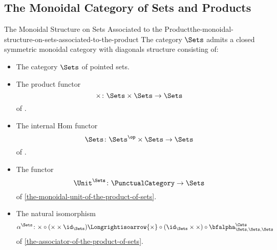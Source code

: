 \subsection{The Monoidal Category of Sets and Products}\label{subsection-the-monoidal-category-of-sets-and-products}
\begin{proposition}{The Monoidal Structure on Sets Associated to the Product}{the-monoidal-structure-on-sets-associated-to-the-product}%
    The category $\Sets$ admits a closed symmetric monoidal category with diagonals structure consisting of:%
    \begin{itemize}
        \item{}The category $\Sets$ of pointed sets.
        \item{}The product functor
            \[
                \times%
                \colon%
                \Sets\times\Sets%
                \to%
                \Sets
            \]%
            of .
        \item{}The internal Hom functor
            \[
                \Sets%
                \colon%
                \Sets^{\op}\times\Sets%
                \to%
                \Sets%
            \]%
            of .
        \item{}The functor
            \[
                \Unit^{\Sets}
                \colon
                \PunctualCategory
                \to
                \Sets
            \]%
            of \cref{the-monoidal-unit-of-the-product-of-sets}.
        \item{}The natural isomorphism
            \[
                \alpha^{\Sets}
                \colon
                {\times}\circ{({\times}\times\id_{\Sets})}
                \Longrightisoarrow
                {\times}\circ{(\id_{\Sets}\times{\times})}\circ{\bfalpha^{\Cats}_{\Sets,\Sets,\Sets}}
            \]%
            of \cref{the-associator-of-the-product-of-sets}.

\end{itemize}
\end{proposition}
